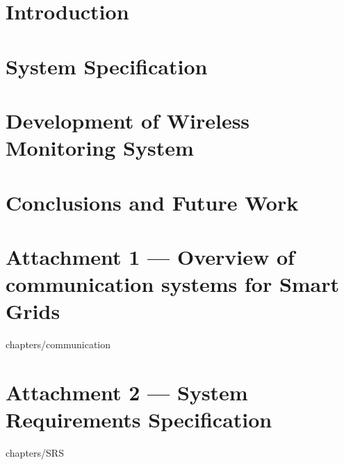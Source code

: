 \documentclass[10pt,a4paper,twoside]{report}
\begin{document}




\begin{Prolog}
\cleardoublepage

\tableofcontents



%

	
\end{Prolog}

\StartBody

\chapter{Introduction}



\chapter{System Specification}


\chapter{Development of Wireless Monitoring System}


%

\chapter{Conclusions and Future Work}







%


%
%

\chapter*{Attachment 1 --- \large{Overview of communication systems for Smart Grids}}
  {chapters/communication}
\chapter*{Attachment 2 --- \large{System Requirements Specification}}
  {chapters/SRS}
\end{document}
